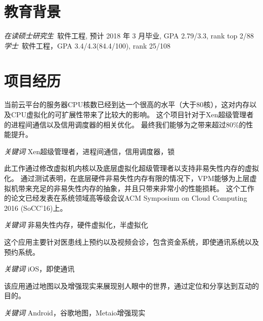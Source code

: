 \documentclass{resume}
\begin{document}


 
\section{教育背景}
\textit{在读硕士研究生}\ 软件工程, 预计 2018 年 3 月毕业, GPA 2.79/3.3, rank top 2/88
\textit{学士}\ 软件工程，GPA 3.4/4.3(84.4/100), rank 25/108

\section{项目经历}
当前云平台的服务器CPU核数已经到达一个很高的水平（大于80核），这对内存以及CPU虚拟化的可扩展性带来了比较大的影响。
这个项目针对于Xen超级管理者的进程间通信以及信用调度器的相关优化。
最终我们能够为之带来超过80\%的性能提升。

\textit{关键词} Xen超级管理者，进程间通信，信用调度器，锁

此工作通过修改虚拟机内核以及底层虚拟化超级管理者以支持非易失性内存的虚拟化。
通过测试表明，在底层硬件非易失性内存有限的情况下，VPM能够为上层虚拟机带来充足的非易失性内存的抽象，并且只带来非常小的性能损耗。
这个工作的论文已经发表在系统领域高等级会议ACM Symposium on Cloud Computing 2016 (SoCC'16)上。

\textit{关键词} 非易失性内存，硬件虚拟化，半虚拟化


这个应用主要针对医患线上预约以及视频会诊，包含资金系统，即使通讯系统以及预约系统。

\textit{关键词} iOS，即使通讯

该应用通过地图以及增强现实来展现别人眼中的世界，通过定位和分享达到互动的目的。

\textit{关键词} Android，谷歌地图，Metaio增强现实


\end{document}
